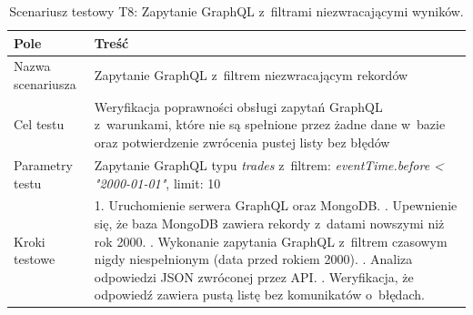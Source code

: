 \begin{table}[H]
    \centering
    \caption{Scenariusz testowy T8: Zapytanie GraphQL z~filtrami niezwracającymi wyników.}
    \label{tab:test_graphql_empty}
    \begin{tabular}{|p{}|p{}|}
        \hline
        \textbf{Pole}        & \textbf{Treść}                                                                                                                                                                                                                                                                                                                                                                                     \\ \hline
        Nazwa scenariusza    & Zapytanie GraphQL z~filtrem niezwracającym rekordów                                                                                                                                                                                                                                                                                                                                                \\ \hline
        Cel testu            & Weryfikacja poprawności obsługi zapytań GraphQL z~warunkami, które nie są spełnione przez żadne dane w~bazie oraz potwierdzenie zwrócenia pustej listy bez błędów                                                                                                                                                                                                                                  \\ \hline
        Parametry testu      & Zapytanie GraphQL typu \textit{trades} z~filtrem: \textit{eventTime.before < "2000-01-01"}, limit: 10                                                                                                                                                                                                                                                                                              \\ \hline
        Kroki testowe        & 1. Uruchomienie serwera GraphQL oraz MongoDB. \newline 2. Upewnienie się, że baza MongoDB zawiera rekordy z~datami nowszymi niż rok 2000. \newline 3. Wykonanie zapytania GraphQL z~filtrem czasowym nigdy niespełnionym (data przed rokiem 2000). \newline 4. Analiza odpowiedzi JSON zwróconej przez API\@. \newline 5. Weryfikacja, że odpowiedź zawiera pustą listę bez komunikatów o~błędach. \\ \hline

\end{tabular}
\end{table}
